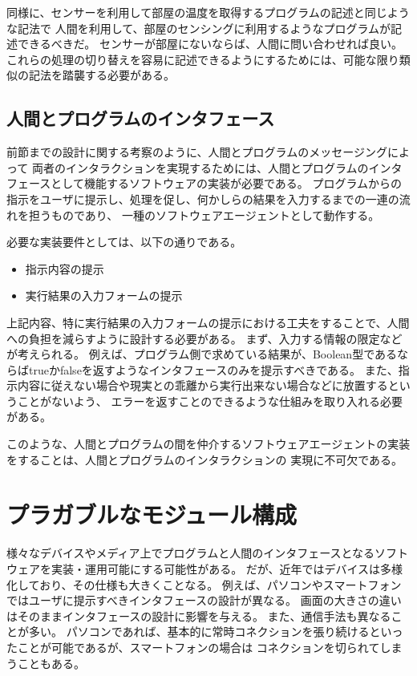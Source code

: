 同様に、センサーを利用して部屋の温度を取得するプログラムの記述と同じような記法で
人間を利用して、部屋のセンシングに利用するようなプログラムが記述できるべきだ。
センサーが部屋にないならば、人間に問い合わせれば良い。
これらの処理の切り替えを容易に記述できるようにするためには、可能な限り類似の記法を踏襲する必要がある。

\subsection{人間とプログラムのインタフェース}\label{ux4ebaux9593ux3068ux30d7ux30edux30b0ux30e9ux30e0ux306eux30a4ux30f3ux30bfux30d5ux30a7ux30fcux30b9}

前節までの設計に関する考察のように、人間とプログラムのメッセージングによって
両者のインタラクションを実現するためには、人間とプログラムのインタフェースとして機能するソフトウェアの実装が必要である。
プログラムからの指示をユーザに提示し、処理を促し、何かしらの結果を入力するまでの一連の流れを担うものであり、
一種のソフトウェアエージェントとして動作する。

必要な実装要件としては、以下の通りである。

\begin{itemize}
\itemsep1pt\parskip0pt
\item
  指示内容の提示
\item
  実行結果の入力フォームの提示
\end{itemize}

上記内容、特に実行結果の入力フォームの提示における工夫をすることで、人間への負担を減らすように設計する必要がある。
まず、入力する情報の限定などが考えられる。
例えば、プログラム側で求めている結果が、Boolean型であるならばtrueかfalseを返すようなインタフェースのみを提示すべきである。
また、指示内容に従えない場合や現実との乖離から実行出来ない場合などに放置するということがないよう、
エラーを返すことのできるような仕組みを取り入れる必要がある。

このような、人間とプログラムの間を仲介するソフトウェアエージェントの実装をすることは、人間とプログラムのインタラクションの
実現に不可欠である。

\section{プラガブルなモジュール構成}\label{sec:plaggable-module-design}

様々なデバイスやメディア上でプログラムと人間のインタフェースとなるソフトウェアを実装・運用可能にする可能性がある。
だが、近年ではデバイスは多様化しており、その仕様も大きくことなる。
例えば、パソコンやスマートフォンではユーザに提示すべきインタフェースの設計が異なる。
画面の大きさの違いはそのままインタフェースの設計に影響を与える。
また、通信手法も異なることが多い。
パソコンであれば、基本的に常時コネクションを張り続けるといったことが可能であるが、スマートフォンの場合は
コネクションを切られてしまうこともある。

